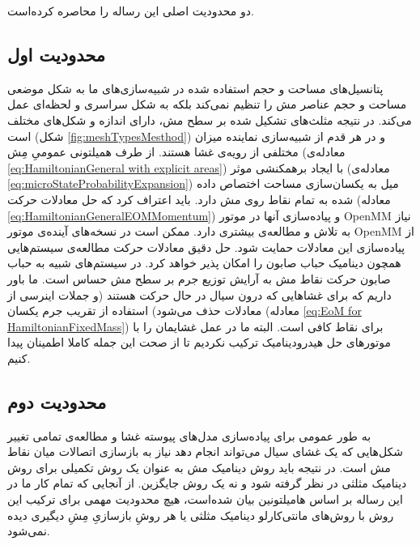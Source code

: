  

دو محدودیت اصلی این رساله را محاصره کرده‌است.
\subsection{
محدودیت اول
}

پتانسیل‌های مساحت و حجم استفاده شده در  شبیه‌سازی‌های ما به شکل موضعی
\cite{Vutukuri2020}
مساحت و حجم عناصر مش را تنظیم نمی‌کند بلکه به شکل سراسری و لحظه‌ای عمل می‌کند. در نتیجه مثلث‌های تشکیل شده بر سطح مش، دارای اندازه و شکل‌‌های مختلف است (شکل
\ref{fig:meshTypesMesthod})
و در هر قدم از شبیه‌سازی نماینده میزان مختلفی از رویه‌ی غشا هستند. از طرف همیلتونی عمومیِ مِش (معادله‌ی
\ref{eq:HamiltonianGeneral with explicit areas})
با ایجاد برهمکنشی موثر (معادله‌ی
\ref{eq:microStateProbabilityExpansion})
میل به یکسان‌سازی مساحت اختصاص داده شده به تمام نقاط روی مش دارد.  باید اعتراف کرد که حل معادلات حرکت (معادله
\ref{eq:HamiltonianGeneralEOMMomentum})
 و پیاده‌سازی آنها در موتور 
OpenMM
نیاز به تلاش و مطالعه‌ی بیشتری دارد. ممکن است در نسخه‌های آینده‌ی موتور
OpenMM
از پیاده‌سازی این معادلات حمایت شود. حل دقیق معادلات حرکت مطالعه‌ی سیستم‌هایی همچون دینامیک حباب صابون را امکان پذیر خواهد کرد. در سیستم‌های شبیه‌ به حباب صابون حرکت نقاط مش به آرایش توزیع جرم بر سطح مش حساس است. ما باور داریم که برای غشا‌هایی که درون سیال در حال حرکت هستند (و جملات اینرسی از معادلات حذف می‌شود) استفاده از تقریب جرم یکسان (معادله
\ref{eq:EoM for HamiltonianFixedMass})
 برای نقاط کافی است. البته ما در عمل غشایمان را با موتورهای حل هیدرودینامیک
\cite{MPCD2008JCP}
 ترکیب نکردیم تا از صحت این جمله کاملا اطمینان پیدا کنیم.

\subsection{
محدودیت دوم
}


به طور عمومی برای پیاده‌سازی مدل‌های پیوسته غشا و مطالعه‌ی تمامی تغییر شکل‌هایی که یک غشای سیال می‌تواند انجام دهد نیاز به بازسازی اتصالات میان نقاط مش است. در نتیجه باید روش دینامیک مش به عنوان یک روش تکمیلی برای روش دینامیک مثلثی در نظر گرفته شود و نه یک روش جایگزین. از آنجایی که تمام کار ما در این رساله بر اساس هامیلتونین بیان شده‌است، هیچ محدودیت مهمی برای ترکیب این روش با روش‌های مانتی‌کارلو دینامیک مثلثی یا هر روشِ بازسازیِ مِشِ دیگیری دیده نمی‌شود.



